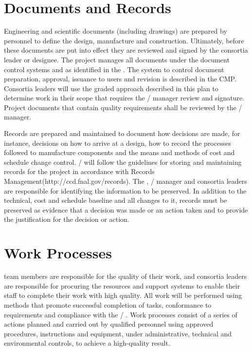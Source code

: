 \section{Documents and Records}

Engineering and scientific documents (including drawings) are prepared
by  personnel to define the design, manufacture and
construction. Ultimately, before these documents are put into effect
they are reviewed and signed by the  consortia leader or
designee. The  project manages all documents under the
document control systems  and \docdb as identified in the
 .  The system to control document preparation,
approval, issuance to users and revision is described in the
CMP. Consortia leaders will use the graded approach described in this
plan to determine work in their scope that requires the
/  manager review and
signature. Project documents that contain quality requirements shall
be reviewed by the /  manager.

Records are prepared and maintained to document how decisions are
made, for instance, decisions on how to arrive at a design, how to
record the processes followed to manufacture components and the means
and methods of cost and schedule change
control. / will follow the guidelines for
storing and maintaining records for the project in accordance with
\fnal Records Management(http://ccd.fnal.gov/records). The
 , /
 manager and consortia leaders are responsible for
identifying the information to be preserved. In addition to the
technical, cost and schedule baseline and all changes to it, records
must be preserved as evidence that a decision was made or an action
taken and to provide the justification for the decision or action.

\section{Work Processes}

 team members are responsible for the quality of their work, and
consortia leaders are responsible for procuring the resources and
support systems to enable their staff to complete their work with high
quality. All  work will be performed using methods that promote
successful completion of tasks, conformance to  requirements and
compliance with the / . Work processes
consist of a series of actions planned and carried out by qualified
personnel using approved procedures, instructions and equipment, under
administrative, technical and environmental controls, to achieve a
high-quality result.

